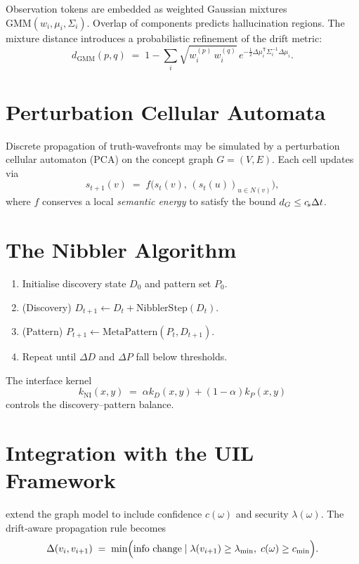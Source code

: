Observation tokens are embedded as weighted Gaussian mixtures $\text{GMM}(w_i,\mu_i,\Sigma_i)$.
Overlap of components predicts hallucination regions.  The mixture distance
introduces a probabilistic refinement of the drift metric:
\begin{equation}
  d_{\text{GMM}}(p,q) \;=\; 1 - \sum_i \sqrt{w_i^{(p)}\,w_i^{(q)}}\,e^{-\tfrac12\Delta\mu_i^{\mathsf T}\Sigma_i^{-1}\Delta\mu_i}.
\end{equation}

\section{Perturbation Cellular Automata}\label{sec:PCA}

Discrete propagation of truth‑wavefronts may be simulated by a perturbation cellular
automaton (PCA) on the concept graph $G=(V,E)$.  Each cell updates via
\begin{equation}
  s_{t+1}(v)\;=\;f\bigl(s_t(v),\,(s_t(u))_{u\in N(v)}\bigr),
\end{equation}
where $f$ conserves a local \emph{semantic energy} to satisfy the bound $d_G\le c_{\!s}\Delta t$.

\section{The Nibbler Algorithm}\label{sec:Nibbler}

\begin{enumerate}
  \item Initialise discovery state $D_0$ and pattern set $P_0$.
  \item (Discovery)  $D_{t+1} \leftarrow D_t + \text{NibblerStep}(D_t)$.  
  \item (Pattern)    $P_{t+1} \leftarrow \text{MetaPattern}(P_t, D_{t+1})$.
  \item Repeat until $\Delta D$ and $\Delta P$ fall below thresholds.
\end{enumerate}
The interface kernel
\begin{equation}
  k_{\text{NI}}(x,y)\;=\;\alpha k_D(x,y) + (1-\alpha)k_P(x,y)
\end{equation}
controls the discovery–pattern balance.

\section{Integration with the UIL Framework}\label{sec:UIL-integr}

\textcite{Integration_UIL} extend the graph model to include confidence $c(\omega)$ and
security $\lambda(\omega)$.  The drift‑aware propagation rule becomes
\begin{equation}
  \Delta( v_i, v_{i+1} )\;=\;\min\Bigl(\text{info change}\mid
  \lambda(v_{i+1})\ge\lambda_{\min},\;c(\omega)\ge c_{\min}\Bigr).
\end{equation}

